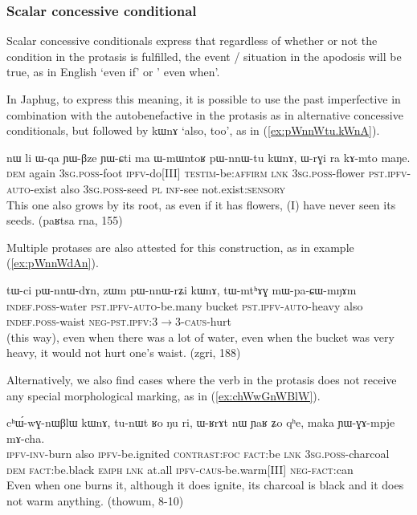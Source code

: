 \documentclass[oldfontcommands,oneside,a4paper,11pt]{article}
\newcommand{\ipa}[1]{{\phon \mbox{#1}}} %
\newcommand{\refb}[1]{(\ref{#1})}
\begin{document}
\subsubsection{Scalar concessive conditional}
Scalar concessive conditionals express that regardless of whether or not the condition in the protasis is fulfilled, the event / situation in the apodosis will be true, as in English `even if' or ' even when'.


In Japhug, to express this meaning, it is possible to use the past imperfective in combination with the autobenefactive in the protasis as in alternative concessive conditionals, but followed by \ipa{kɯnɤ} `also, too', as in \refb{ex:pWnnWtu.kWnA}.


 \begin{exe}
\ex  \label{ex:pWnnWtu.kWnA}
\gll
\ipa{nɯ}    	\ipa{li}    	\ipa{ɯ-qa}    	\ipa{ɲɯ-βze}    	\ipa{ɲɯ-ɕti}    	\ipa{ma}    	\ipa{ɯ-mɯntoʁ}    	\ipa{pɯ-nnɯ-tu}    	\ipa{kɯnɤ,}    	\ipa{ɯ-rɣi}    	\ipa{ra}    	\ipa{kɤ-mto}    	\ipa{maŋe.}    \\
\textsc{dem} again \textsc{3sg.poss}-foot \textsc{ipfv}-do[III] \textsc{testim}-be:\textsc{affirm} \textsc{lnk} \textsc{3sg.poss}-flower \textsc{pst.ipfv-auto}-exist also \textsc{3sg.poss}-seed \textsc{pl} \textsc{inf}-see not.exist:\textsc{sensory} \\
\glt This one also grows by its root, as even if it has flowers, (I) have never seen its seeds. (paʁtsa rna, 155)
\end{exe}
Multiple protases are also attested for this construction, as in example   \refb{ex:pWnnWdAn}.
\begin{exe}
\ex  \label{ex:pWnnWdAn}
\gll
\ipa{tɯ-ci}    	\ipa{pɯ-nnɯ-dɤn,}    	\ipa{zɯm}    	\ipa{pɯ-nnɯ-rʑi}    	\ipa{kɯnɤ,}    	\ipa{tɯ-mtʰɤɣ}    	\ipa{mɯ-pa-ɕɯ-mŋɤm}    \\
\textsc{indef.poss}-water \textsc{pst.ipfv-auto}-be.many bucket  \textsc{pst.ipfv-auto}-heavy also \textsc{indef.poss}-waist \textsc{neg-pst.ipfv:3$\rightarrow$3-caus}-hurt\\
\glt (this way), even when there was a lot of water, even when the bucket was very heavy, it would not hurt one's waist. (zgri, 188)
\end{exe}

Alternatively, we also find cases where the verb in the protasis does not receive any special morphological marking, as in \refb{ex:chWwGnWBlW}.
\begin{exe}
\ex  \label{ex:chWwGnWBlW}
\gll
\ipa{cʰɯ́-wɣ-nɯβlɯ}    	\ipa{kɯnɤ,}    	\ipa{tu-nɯt}    	\ipa{ʁo}    	\ipa{ŋu}    	\ipa{ri,}    	\ipa{ɯ-ʁrɤt}    	\ipa{nɯ}    	\ipa{ɲaʁ}    	\ipa{ʑo}    	\ipa{qʰe,}    	\ipa{maka}    	\ipa{ɲɯ-ɣɤ-mpje}    	\ipa{mɤ-cha.}    	\\
\textsc{ipfv-inv}-burn also \textsc{ipfv}-be.ignited \textsc{contrast:foc} \textsc{fact}:be \textsc{lnk}
\textsc{3sg.poss}-charcoal \textsc{dem}  \textsc{fact}:be.black \textsc{emph} \textsc{lnk} at.all \textsc{ipfv-caus}-be.warm[III] \textsc{neg-fact}:can \\
\glt Even when one burns it, although it does ignite, its charcoal is black and it does not warm anything. (thowum, 8-10)
\end{exe}
\end{document}
